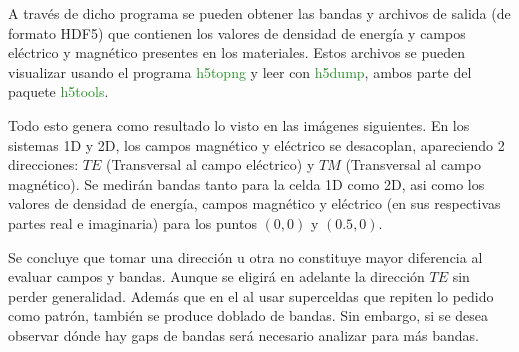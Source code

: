 \documentclass{book}
\begin{document}
A través de dicho programa se pueden obtener las bandas y archivos de salida (de formato HDF5) que contienen los valores de densidad de energía y campos eléctrico y magnético presentes en los materiales. Estos archivos se pueden visualizar usando el programa \textcolor{ForestGreen}{h5topng} y leer con \textcolor{ForestGreen}{h5dump}, ambos parte del paquete \textcolor{ForestGreen} {h5tools}.

Todo esto genera como resultado lo visto en las imágenes siguientes. En los sistemas 1D y 2D, los campos magnético y eléctrico se desacoplan, apareciendo 2 direcciones: $TE$ (Transversal al campo eléctrico) y $TM$ (Transversal al campo magnético). Se medirán bandas tanto para la celda 1D como 2D, asi como los valores de densidad de energía, campos magnético y eléctrico (en sus respectivas partes real e imaginaria) para los puntos $(0,0)$ y $(0.5,0)$. 

Se concluye que tomar una dirección u otra no constituye mayor diferencia al evaluar campos y bandas. Aunque se eligirá en adelante la dirección $TE$ sin perder generalidad. Además que en el al usar superceldas que repiten lo pedido como patrón, también se produce doblado de bandas. Sin embargo, si se desea observar dónde hay gaps de bandas será necesario analizar para más bandas.
\end{document}
